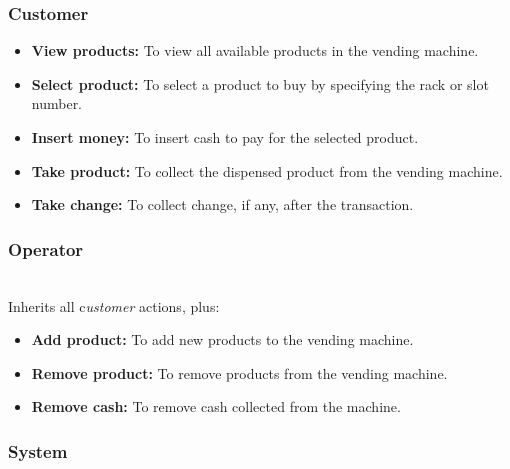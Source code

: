 \subsubsection{Customer}\label{pzcuhXubNYl4iMGBAt3Oa}

\begin{itemize}
\item
\protect{}\label{9zljpZEUNwlsYhslAO7OQ}
\textbf{View products:} To view all available products in the vending machine.
\item
\protect{}\label{3zFATiSNfVLwcjhJWj-BH}
\textbf{Select product:} To select a product to buy by specifying the rack or slot number.
\item
\protect{}\label{JZl-83-GqKOmyIKvGsY_K}
\textbf{Insert money:} To insert cash to pay for the selected product.
\item
\protect{}\label{9ZDJkhkzU71X8TYQePgry}
\textbf{Take product:} To collect the dispensed product from the vending machine.
\item
\protect{}\label{RP5GgimjEYTFt_Qmcsq-4}
\textbf{Take change:} To collect change, if any, after the transaction.
\end{itemize}

\subsubsection{Operator}\label{GKDnjn107mYebMPUS2Lyl}
\\
Inherits all c\emph{ustomer} actions, plus:

\begin{itemize}
\item
\protect{}\label{NmMVBdRlR_0NuhJgpQKdG}
\textbf{Add product:} To add new products to the vending machine.
\item
\protect{}\label{SYjga_aI2gofHmprnMAAF}
\textbf{Remove product:} To remove products from the vending machine.
\item
\protect{}\label{UK6ho8zSTStfBgI_PAHVP}
\textbf{Remove cash:} To remove cash collected from the machine.
\end{itemize}

\subsubsection{System}\label{zg2nyepQ-leY24IMX_cFJ}

